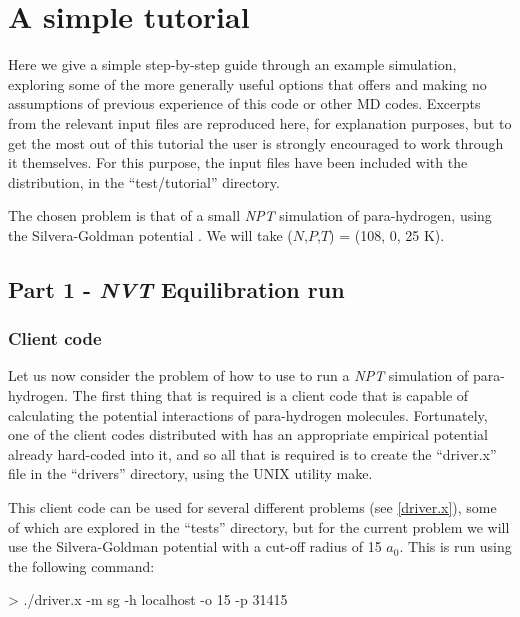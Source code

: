 \documentclass[11pt,english,fleqn]{report}
\newenvironment{code}{%
\footnotesize 
\verbatim
}{
\endverbatim
\normalsize
}
\begin{document}
\section{A simple tutorial}

Here we give a simple step-by-step guide through an example
simulation, exploring
some of the more generally useful options that \ipi offers and making
no assumptions of previous experience of this code or other MD codes.
Excerpts from the relevant input files are reproduced here, for explanation
purposes, but to get the most out of this tutorial the user is strongly encouraged
to work through it themselves. For this purpose, the input files
have been included with the \ipi distribution, in the {}``test/tutorial''
directory.

The chosen problem is that of a small \emph{NPT} simulation of para-hydrogen, 
using the Silvera-Goldman potential \cite{silv-gold78jcp}. 
We will take (\(N\),\(P\),\(T\)) = (108, 0, 25 K).

\subsection{Part 1 - \emph{NVT} Equilibration run}

\label{part1}

\subsubsection{Client code}

Let us now consider the problem of how to use \ipi to run a \emph{NPT}
simulation of para-hydrogen. The first thing that is required is a
client code that is capable of calculating the potential interactions
of para-hydrogen molecules. Fortunately, one of the client codes distributed
with \ipi has an appropriate empirical potential already hard-coded
into it, and
so all that is required is to create the {}``driver.x'' file in
the {}``drivers'' directory, using the UNIX utility make.

This client code can be used for several different problems
(see \ref{driver.x}), some of which
are explored in the {}``tests'' directory, but for the current problem
we will use the Silvera-Goldman potential with a cut-off radius
of 15 \(a_0\). This is run using the following command:

\begin{code}
> ./driver.x -m sg -h localhost -o 15 -p 31415
\end{code}
\end{document}
